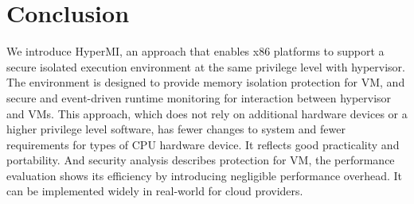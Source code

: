 \documentclass[conference]{IEEEtran}
\begin{document}
\section{Conclusion}\label{sec:conclusion}
We introduce HyperMI, an approach that enables x86 platforms to support a secure isolated execution environment at the same privilege level with hypervisor. The environment is designed to provide memory isolation protection for VM, and secure and event-driven runtime monitoring for interaction between hypervisor and VMs. This approach, which does not rely on additional hardware devices or a higher privilege level software, has fewer changes to system and fewer requirements for types of CPU hardware device. It reflects good practicality and portability. And security analysis describes protection for VM, the performance evaluation shows its efficiency by introducing negligible performance overhead. It can be implemented widely in real-world for cloud providers.
 

\end{document}
